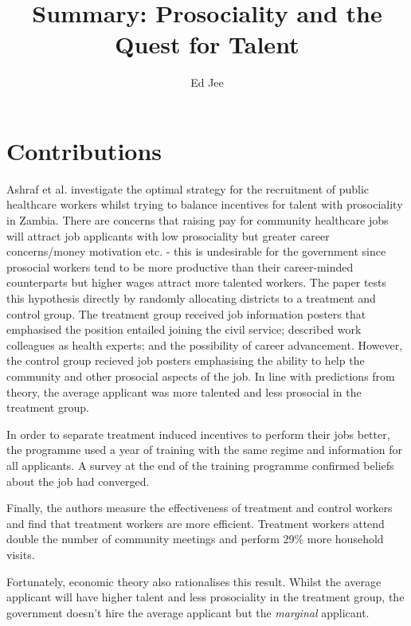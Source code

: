 \documentclass{article}
\author{Ed Jee}
\title{Summary: Prosociality and the Quest for Talent}
\begin{document}
\maketitle 


\section*{Contributions}


Ashraf et al. investigate the optimal strategy for the recruitment of public 
healthcare workers whilst trying to balance incentives for talent with prosociality 
in Zambia.
There are concerns that raising pay for community healthcare jobs will attract job applicants 
with low prosociality but greater career concerns/money motivation etc. - this 
is undesirable for the government since prosocial workers tend to be more 
productive than their career-minded counterparts but higher wages attract 
more talented workers. The paper tests this 
hypothesis directly by randomly allocating districts to a treatment and control 
group. The treatment group received job information posters that emphasised the 
position entailed joining the civil service; described work colleagues as 
health experts; and the possibility of career advancement. However, the control 
group recieved job posters emphasising the ability to help the community and 
other prosocial aspects of the job. In line with predictions from theory, 
the average applicant was more talented and less prosocial in the treatment 
group.


In order to separate treatment induced incentives to perform their jobs better, 
the programme used a year of training with the same regime and information for all applicants.
A survey at the end of the training programme confirmed beliefs about the job 
had converged.


Finally, the authors measure the effectiveness of treatment and control workers 
and find that treatment workers are more efficient. Treatment workers attend 
double the number of community meetings and perform 29\% more household visits.


Fortunately, economic theory also rationalises this result. Whilst the average 
applicant will have higher talent and less prosociality in the treatment group, 
the government doesn't hire the average applicant but the \textit{marginal} 
applicant.
\end{document}
